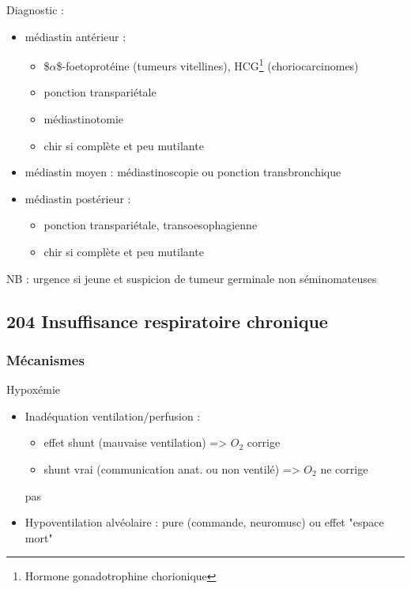 \documentclass[11pt]{article}
\begin{document}
Diagnostic :

\begin{itemize}
\item médiastin antérieur : 

\begin{itemize}
\item \$\(\alpha\)\$-foetoprotéine (tumeurs vitellines), HCG\footnote{Hormone gonadotrophine chorionique} (choriocarcinomes)
\item ponction transpariétale
\item médiastinotomie
\item chir si complète et peu mutilante
\end{itemize}

\item médiastin moyen : médiastinoscopie ou ponction transbronchique
\item médiastin postérieur : 

\begin{itemize}
\item ponction transpariétale, transoesophagienne
\item chir si complète et peu mutilante
\end{itemize}
\end{itemize}



NB : urgence si jeune et suspicion de tumeur germinale non séminomateuses

\subsection{204 \textdagger{} Insuffisance respiratoire chronique}
\label{sec:org93330f9}
\label{sec:org6d633b6}
\subsubsection{Mécanismes}
\label{sec:org3965a3c}
\label{sec:org47f478d}
Hypoxémie

\begin{itemize}
\item Inadéquation ventilation/perfusion :

\begin{itemize}
\item effet shunt (mauvaise ventilation) => \(O_2\) corrige
\item shunt vrai (communication anat. ou non ventilé) => \(O_2\) ne corrige
\end{itemize}
pas

\item Hypoventilation alvéolaire : pure (commande, neuromusc) ou effet "espace mort"
\end{itemize}
\end{document}
